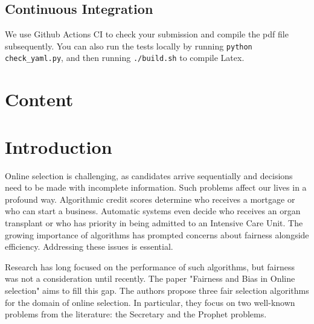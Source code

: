 \subsection{Continuous Integration}

We use Github Actions CI to check your submission and compile the pdf file subsequently.
You can also run the tests locally by running \texttt{python check\_yaml.py}, and then running \texttt{./build.sh} to compile Latex.

\clearpage

\section{Content}

\section{Introduction}

Online selection is challenging, as candidates arrive sequentially and decisions need to be made with incomplete information. Such problems affect our lives in a profound way. Algorithmic credit scores determine who receives a mortgage or who can start a business. Automatic systems even decide who receives an organ transplant or who has priority in being admitted to an Intensive Care Unit. The growing importance of algorithms has prompted concerns about fairness alongside efficiency. Addressing these issues is essential.


 Research has long focused on the performance of such algorithms, but fairness was not a consideration until recently.\cite{buchbinder2014secretary,Cayci2020} The paper "Fairness and Bias in Online selection" \cite{correa21} aims to fill this gap. The authors propose three fair selection algorithms for the  domain of online selection. In particular, they focus on two well-known problems from the literature: the Secretary and the Prophet problems.


